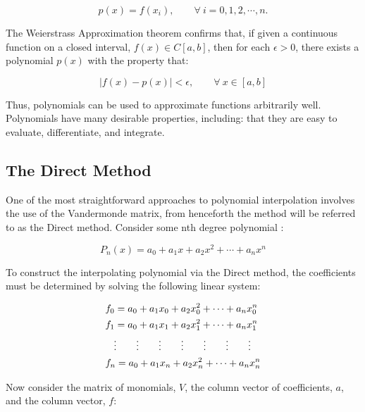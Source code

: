 \documentclass[11pt]{article}%
\begin{document}
\begin{equation}
p\left(x\right) = f(x_i), \qquad \forall \ i = 0, 1,2, \cdots,n.
\end{equation}

The Weierstrass Approximation theorem confirms that, if given a continuous function on a closed interval, $f(x) \in C[a, b]$, then for each $\epsilon > 0$, there exists a polynomial $p(x)$ with the property that:

\begin{equation}
|f(x) - p(x)| < \epsilon, \qquad \forall \ x \in [a, b]
\end{equation}

Thus, polynomials can be used to approximate functions arbitrarily well. Polynomials have many desirable properties, including: that they are easy to evaluate, differentiate, and integrate.

\subsection{The Direct Method}
One of the most straightforward approaches to polynomial interpolation involves the use of the Vandermonde matrix, from henceforth the method will be referred to as the Direct method. Consider some nth degree polynomial \cite{LHK3}:

\begin{equation}
P_n\left(x\right) = a_0 + a_1x + a_2x^2 + \cdots + a_nx^n
\end{equation}

To construct the interpolating polynomial via the Direct method, the coefficients must be determined by solving the following linear system:

\begin{equation}
\begin{split} %
&f_0 = a_0 + a_1x_0 + a_2x_0^2 + \cdots + a_nx_0^n \\
&f_1 = a_0 + a_1x_1 + a_2x_1^2 + \cdots + a_nx_1^n \\
&\hspace{0.3cm} \vdots \qquad \vdots \qquad \vdots \qquad \vdots \qquad \vdots \qquad \vdots \qquad \vdots \\
&f_n = a_0 + a_1x_n + a_2x_n^2 + \cdots + a_nx_n^n
\end{split}
\end{equation}

Now consider the matrix of monomials, $V$, the column vector of coefficients, $a$, and the column vector, $f$:
\end{document}
